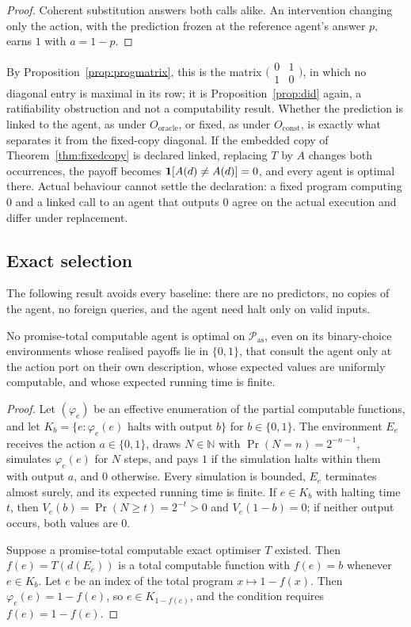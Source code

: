 \begin{proof}
Coherent substitution answers both calls alike. An intervention changing only the action, with the
prediction frozen at the reference agent's answer $p$, earns $1$ with $a=1-p$.
\end{proof}

By Proposition~\ref{prop:progmatrix}, this is the matrix
$\bigl(\begin{smallmatrix}0&1\\1&0\end{smallmatrix}\bigr)$, in which no diagonal entry is maximal in
its row; it is Proposition~\ref{prop:did} again, a ratifiability obstruction and not a computability
result. Whether the prediction is linked to the agent, as under $O_{\mathrm{oracle}}$, or fixed, as
under $O_{\mathrm{const}}$, is exactly what separates it from the fixed-copy diagonal. If the embedded
copy of Theorem~\ref{thm:fixedcopy} is declared linked, replacing $T$ by $A$ changes both
occurrences, the payoff becomes $\mathbf{1}[A(d)\ne A(d)]=0$, and every agent is optimal there. Actual
behaviour cannot settle the declaration: a fixed program computing $0$ and a linked call to an agent
that outputs $0$ agree on the actual execution and differ under replacement.

\subsection{Exact selection}

The following result avoids every baseline: there are no predictors, no copies of the agent, no
foreign queries, and the agent need halt only on valid inputs.

\begin{theorem}\label{thm:exactsel}
No promise-total computable agent is optimal on $\mathcal P_{\mathrm{as}}$, even on its binary-choice
environments whose realised payoffs lie in $\{0,1\}$, that consult the agent only at the action port
on their own description, whose expected values are uniformly computable, and whose expected running
time is finite.
\end{theorem}

\begin{proof}
Let $(\varphi_e)$ be an effective enumeration of the partial computable functions, and let
$K_b=\{e:\varphi_e(e)\text{ halts with output }b\}$ for $b\in\{0,1\}$. The environment $E_e$ receives
the action $a\in\{0,1\}$, draws $N\in\mathbb N$ with $\Pr(N=n)=2^{-n-1}$, simulates $\varphi_e(e)$ for $N$
steps, and pays $1$ if the simulation halts within them with output $a$, and $0$ otherwise. Every
simulation is bounded, $E_e$ terminates almost surely, and its expected running time is finite. If
$e\in K_b$ with halting time $t$, then $V_e(b)=\Pr(N\ge t)=2^{-t}>0$ and $V_e(1-b)=0$; if neither
output occurs, both values are $0$.

Suppose a promise-total computable exact optimiser $T$ existed. Then $f(e)=T(d(E_e))$ is a total
computable function with $f(e)=b$ whenever $e\in K_b$. Let $e$ be an index of the total program
$x\mapsto1-f(x)$. Then $\varphi_e(e)=1-f(e)$, so $e\in K_{1-f(e)}$, and the condition requires
$f(e)=1-f(e)$.
\end{proof}

